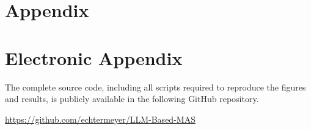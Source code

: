 \documentclass[12pt]{article}
\begin{document}
{}
\listoffigures
\newpage
{}
{}
\listoftables
\newpage
{}
{}
\newpage

\appendix

\section{Appendix}
\label{app}

\newpage

\section{Electronic Appendix}
\label{el_app}
The complete source code, including all scripts required to reproduce the figures and results, is publicly available in the following GitHub repository.

\url{https://github.com/echtermeyer/LLM-Based-MAS}
\end{document}
